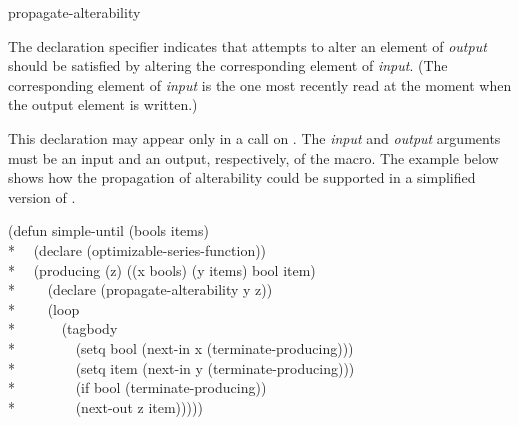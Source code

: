 \begin{defun}
propagate-alterability

The declaration specifier
indicates that attempts to alter an element of \emph{output} should be
satisfied by altering the corresponding element of \emph{input}.    (The
corresponding element of \emph{input} is the one most recently read at the
moment when the output element is written.)

This declaration may
appear only in a call on .  The \emph{input} and \emph{output} arguments must be
an input and an output, respectively, of the  macro.  The example below shows how
the propagation of alterability could be supported in a simplified version
of .
\begin{lisp}
(defun simple-until (bools items) \\*
~~(declare (optimizable-series-function)) \\*
~~(producing (z) ((x bools) (y items) bool item) \\*
~~~~(declare (propagate-alterability y z)) \\*
~~~~(loop \\*
~~~~~~(tagbody \\*
~~~~~~~~(setq bool (next-in x (terminate-producing))) \\*
~~~~~~~~(setq item (next-in y (terminate-producing))) \\*
~~~~~~~~(if bool (terminate-producing)) \\*
~~~~~~~~(next-out z item)))))
\end{lisp}
\end{defun}

